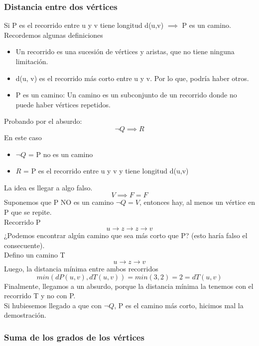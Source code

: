 \documentclass[10pt,a4paper]{article}
\begin{document}
\subsubsection*{Distancia entre dos vértices}
\label{subsubsec:distancia_demostracion}
Si P es el recorrido entre u y v tiene longitud d(u,v) $\implies$ P es un camino. \\
Recordemos algunas definiciones
\begin{itemize}
    \item Un recorrido es una sucesión de vértices y aristas, que no tiene ninguna limitación.
    \item d(u, v) es el recorrido más corto entre u y v. Por lo que, podría haber otros. 
    \item P es un camino: Un camino es un subconjunto de un recorrido donde no puede haber vértices repetidos.
\end{itemize}
Probando por el absurdo: 
\[\neg Q \implies R\]
En este caso
\begin{itemize}
    \item $\neg Q$ = P no es un camino
    \item $R$ = P es el recorrido entre u y v y tiene longitud d(u,v)
\end{itemize}
La idea es llegar a algo falso.  
\[V \implies F = F\]
Suponemos que P NO es un camino $\neg Q = V$, entonces hay, al menos un vértice en P que se repite.  \\
Recorrido P \[u \rightarrow z \rightarrow z \rightarrow v\]
¿Podemos encontrar algún camino que sea más corto que P? (esto haría falso el consecuente). \\
Defino un camino T \[u \rightarrow z \rightarrow v\] 
Luego, la distancia mínima entre ambos recorridos
\[min(dP(u,v), dT(u,v)) = min(3, 2) = 2 = dT(u,v)\]
Finalmente, llegamos a un absurdo, porque la distancia mínima la tenemos con el recorrido T y no con P. \\
Si hubiesemos llegado a que con $\neg Q$, P es el camino más corto, hicimos mal la demostración.
\subsubsection*{Suma de los grados de los vértices}
\label{subsubsec:suma_grados_vertices}
\end{document}
